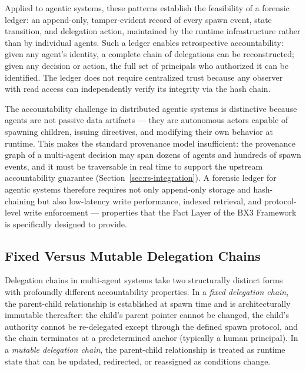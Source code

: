 Applied to agentic systems, these patterns establish the feasibility of a forensic ledger: an append-only, tamper-evident record of every spawn event, state transition, and delegation action, maintained by the runtime infrastructure rather than by individual agents. Such a ledger enables retrospective accountability: given any agent's identity, a complete chain of delegations can be reconstructed; given any decision or action, the full set of principals who authorized it can be identified. The ledger does not require centralized trust because any observer with read access can independently verify its integrity via the hash chain.

The accountability challenge in distributed agentic systems is distinctive because agents are not passive data artifacts --- they are autonomous actors capable of spawning children, issuing directives, and modifying their own behavior at runtime. This makes the standard provenance model insufficient: the provenance graph of a multi-agent decision may span dozens of agents and hundreds of spawn events, and it must be traversable in real time to support the upstream accountability guarantee (Section~\ref{sec:rs-integration}). A forensic ledger for agentic systems therefore requires not only append-only storage and hash-chaining but also low-latency write performance, indexed retrieval, and protocol-level write enforcement --- properties that the Fact Layer of the BX3 Framework is specifically designed to provide.

\subsection{Fixed Versus Mutable Delegation Chains}

Delegation chains in multi-agent systems take two structurally distinct forms with profoundly different accountability properties. In a \emph{fixed delegation chain}, the parent-child relationship is established at spawn time and is architecturally immutable thereafter: the child's parent pointer cannot be changed, the child's authority cannot be re-delegated except through the defined spawn protocol, and the chain terminates at a predetermined anchor (typically a human principal). In a \emph{mutable delegation chain}, the parent-child relationship is treated as runtime state that can be updated, redirected, or reassigned as conditions change.

